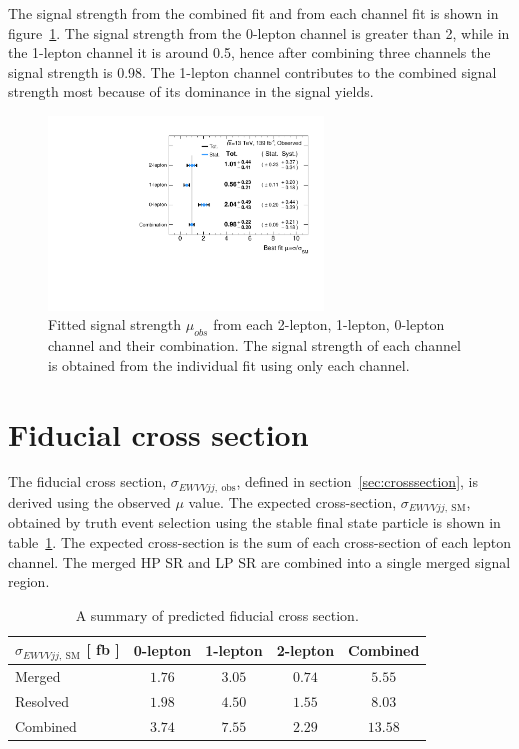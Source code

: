 The signal strength from the combined fit and from each channel fit is shown in figure~\ref{fig:muhat}.
The signal strength from the 0-lepton channel is greater than 2, while in the 1-lepton channel it is around 0.5, hence after combining three channels the signal strength is 0.98.
The 1-lepton channel contributes to the combined signal strength most because of its dominance in the signal yields.
\begin{figure}[]
      \centering
        \includegraphics[width=0.65\textwidth]{figures/Muhat_channels}
        \caption{Fitted signal strength $\mu_{obs}$ from each 2-lepton, 1-lepton, 0-lepton channel and their combination. The signal strength of each channel is obtained from the individual fit using only each channel.}
       \label{fig:muhat}
\end{figure}

\section{Fiducial cross section}
The fiducial cross section, $\sigma_{EWVVjj,~\mathrm{obs}}$, defined in section~\ref{sec:crosssection}, is derived using the observed $\mu$ value.
The expected cross-section, $\sigma_{EWVVjj,~\mathrm{SM}}$, obtained by truth event selection using the stable final state particle is shown in table~\ref{tab:expxsec}.
The expected cross-section is the sum of each cross-section of each lepton channel. 
The merged HP SR and LP SR are combined into a single merged signal region.
\begin{table}[H]
\begin{center}
\begin{tabular}{|l|c|c|c||c|}
\hline$\sigma_{EWVVjj,~\mathrm{SM}}$ [ fb ]& 0-lepton & 1-lepton & 2-lepton & Combined\\ \hline 
Merged                                     & $1.76 $   & $3.05 $   & $0.74 $   & $ 5.55$\\  \hline 
Resolved                                   & $1.98 $   & $4.50 $   & $1.55 $   & $ 8.03$\\ \hline
Combined                                   & $3.74 $   & $7.55 $   & $2.29 $   & $ 13.58$\\ \hline
\end{tabular}
\caption{\label{tab:expxsec} A summary of predicted fiducial cross section. }
\end{center}
\end{table}

